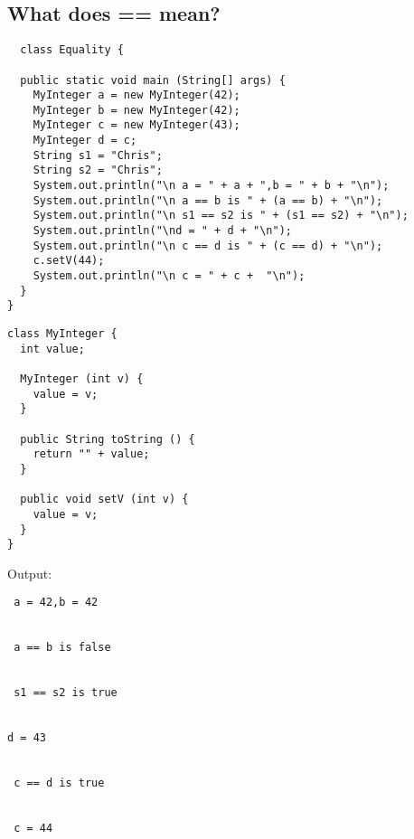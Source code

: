 \documentclass{article}
\begin{document}
\subsection*{What does == mean?}
\begin{verbatim}
  class Equality {

  public static void main (String[] args) {
    MyInteger a = new MyInteger(42);
    MyInteger b = new MyInteger(42);
    MyInteger c = new MyInteger(43);
    MyInteger d = c;
    String s1 = "Chris";
    String s2 = "Chris";
    System.out.println("\n a = " + a + ",b = " + b + "\n");
    System.out.println("\n a == b is " + (a == b) + "\n");
    System.out.println("\n s1 == s2 is " + (s1 == s2) + "\n");
    System.out.println("\nd = " + d + "\n");
    System.out.println("\n c == d is " + (c == d) + "\n");
    c.setV(44);
    System.out.println("\n c = " + c +  "\n");
  }
}
\end{verbatim}
\bigskip
\begin{verbatim}
class MyInteger {
  int value;
  
  MyInteger (int v) {
    value = v;
  }

  public String toString () {
    return "" + value;
  }

  public void setV (int v) {
    value = v;
  }
}
\end{verbatim}
\bigskip
Output:
\begin{verbatim}
 a = 42,b = 42


 a == b is false


 s1 == s2 is true


d = 43


 c == d is true


 c = 44
\end{verbatim}
\end{document}
